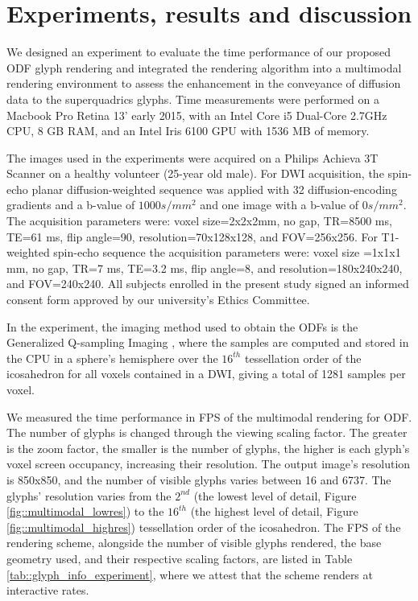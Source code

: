 \documentclass[twoside,twocolumn,10pt]{article}
\begin{document}
\section{Experiments, results and discussion}
\label{sec::results}

We designed an experiment to evaluate the time performance of our proposed ODF glyph rendering and integrated the rendering algorithm into a multimodal rendering environment to assess the enhancement in the conveyance of diffusion data to the superquadrics glyphs. Time measurements were performed on a Macbook Pro Retina 13' early 2015, with an Intel Core i5 Dual-Core 2.7GHz CPU, 8 GB RAM, and an Intel Iris 6100 GPU with 1536 MB of memory.


The images used in the experiments were acquired on a Philips Achieva 3T Scanner on a healthy volunteer (25-year old male). For DWI acquisition, the spin-echo planar diffusion-weighted sequence was applied with 32 diffusion-encoding gradients and a b-value of $1000 s/mm^2$ and one image with a b-value of $0 s/mm^2$. The acquisition parameters were: voxel size=2x2x2mm, no gap, TR=8500 ms, TE=61 ms, flip angle=90, resolution=70x128x128, and FOV=256x256. For T1-weighted spin-echo sequence the acquisition parameters were: voxel size =1x1x1 mm, no gap, TR=7 ms, TE=3.2 ms, flip angle=8, and resolution=180x240x240, and FOV=240x240. All subjects enrolled in the present study signed an informed consent form approved by our university's Ethics Committee.

In the experiment, the imaging method used to obtain the ODFs is the Generalized Q-sampling Imaging \cite{yeh2010}, where the samples are computed and stored in the CPU in a sphere's hemisphere over the $16^{th}$ tessellation order of the icosahedron for all voxels contained in a DWI, giving a total of 1281 samples per voxel.

We measured the time performance in FPS of the multimodal rendering for ODF. The number of glyphs is changed through the viewing scaling factor. The greater is the zoom factor, the smaller is the number of glyphs, the higher is each glyph's voxel screen occupancy, increasing their resolution. The output image's resolution is 850x850, and the number of visible glyphs varies between 16 and 6737. The glyphs' resolution varies from the $2^{nd}$ (the lowest level of detail, Figure \ref{fig::multimodal_lowres}) to the $16^{th}$ (the highest level of detail, Figure \ref{fig::multimodal_highres}) tessellation order of the icosahedron. The FPS of the rendering scheme, alongside the number of visible glyphs rendered, the base geometry used, and their respective scaling factors, are listed in Table \ref{tab::glyph_info_experiment}, where we attest that the scheme renders at interactive rates.
\end{document}
